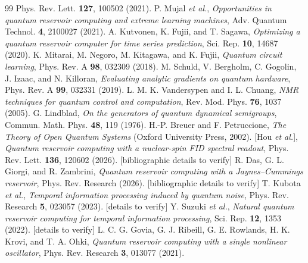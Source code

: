 \documentclass[aps,prresearch,preprint,superscriptaddress,amsmath,amssymb,floatfix]{revtex4-2}
\begin{document}
\begin{thebibliography}{99}
  Phys. Rev. Lett. \textbf{127}, 100502 (2021).
 P. Mujal \emph{et al.}, \emph{Opportunities in quantum reservoir
  computing and extreme learning machines}, Adv. Quantum Technol. \textbf{4}, 2100027
  (2021).
 A. Kutvonen, K. Fujii, and T. Sagawa, \emph{Optimizing a
  quantum reservoir computer for time series prediction}, Sci. Rep. \textbf{10}, 14687
  (2020).
 K. Mitarai, M. Negoro, M. Kitagawa, and K. Fujii, \emph{Quantum
  circuit learning}, Phys. Rev. A \textbf{98}, 032309 (2018).
 M. Schuld, V. Bergholm, C. Gogolin, J. Izaac, and N. Killoran,
  \emph{Evaluating analytic gradients on quantum hardware}, Phys. Rev. A \textbf{99},
  032331 (2019).
 L. M. K. Vandersypen and I. L. Chuang, \emph{NMR
  techniques for quantum control and computation}, Rev. Mod. Phys. \textbf{76}, 1037
  (2005).
 G. Lindblad, \emph{On the generators of quantum dynamical
  semigroups}, Commun. Math. Phys. \textbf{48}, 119 (1976).
 H.-P. Breuer and F. Petruccione, \emph{The Theory of
  Open Quantum Systems} (Oxford University Press, 2002).
 [Hou \emph{et al.}], \emph{Quantum reservoir computing with a
  nuclear-spin FID spectral readout}, Phys. Rev. Lett. \textbf{136}, 120602 (2026).
  [bibliographic details to verify]
 R. Das, G. L. Giorgi, and R. Zambrini, \emph{Quantum reservoir
  computing with a Jaynes--Cummings reservoir}, Phys. Rev. Research (2026).
  [bibliographic details to verify]
 T. Kubota \emph{et al.}, \emph{Temporal information processing
  induced by quantum noise}, Phys. Rev. Research \textbf{5}, 023057 (2023).
  [details to verify]
 Y. Suzuki \emph{et al.}, \emph{Natural quantum reservoir
  computing for temporal information processing}, Sci. Rep. \textbf{12}, 1353 (2022).
  [details to verify]
 L. C. G. Govia, G. J. Ribeill, G. E. Rowlands, H. K. Krovi, and
  T. A. Ohki, \emph{Quantum reservoir computing with a single nonlinear oscillator},
  Phys. Rev. Research \textbf{3}, 013077 (2021).
\end{thebibliography}
\end{document}
